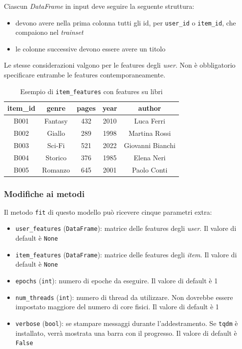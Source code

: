 Ciascun \textit{DataFrame} in input deve seguire la seguente struttura:
\begin{itemize}
    \item devono avere nella prima colonna tutti gli id, per \texttt{user\_id} o \texttt{item\_id}, che compaiono nel \textit{trainset}
    \item le colonne successive devono essere avere un titolo
\end{itemize}

Le stesse considerazioni valgono per le features degli \textit{user}. Non è obbligatorio specificare entrambe le features contemporaneamente.

\begin{table}[H]
    \centering
    \begin{tabular}{|c|c|c|c|c|}
    \hline
    \textbf{item\_id} & \textbf{genre} & \textbf{pages} & \textbf{year} & \textbf{author} \\
    \hline
    B001 & Fantasy       & 432 & 2010 & Luca Ferri       \\
    B002 & Giallo        & 289 & 1998 & Martina Rossi     \\
    B003 & Sci-Fi        & 521 & 2022 & Giovanni Bianchi  \\
    B004 & Storico       & 376 & 1985 & Elena Neri        \\
    B005 & Romanzo       & 645 & 2001 & Paolo Conti       \\
    \hline
    \end{tabular}
    \caption{Esempio di \texttt{item\_features} con features su libri}
    \label{tab:book_metadata}
\end{table}

\subsubsection{Modifiche ai metodi}

Il metodo \texttt{fit} di questo modello può ricevere cinque parametri extra:

\begin{itemize}
    \item \texttt{user\_features} (\texttt{DataFrame}): matrice delle features degli \textit{user}. Il valore di default è \texttt{None}
    \item \texttt{item\_features} (\texttt{DataFrame}): matrice delle features degli \textit{item}. Il valore di default è \texttt{None}
    \item \texttt{epochs} (\texttt{int}): numero di epoche da eseguire. Il valore di default è 1
    \item \texttt{num\_threads} (\texttt{int}): numero di thread da utilizzare. Non dovrebbe essere impostato maggiore del numero di core fisici. Il valore di default è 1
    \item \texttt{verbose} (\texttt{bool}): se stampare messaggi durante l'addestramento. Se \texttt{tqdm} è installato, verrà mostrata una barra con il progresso. Il valore di default è \texttt{False}
\end{itemize}

